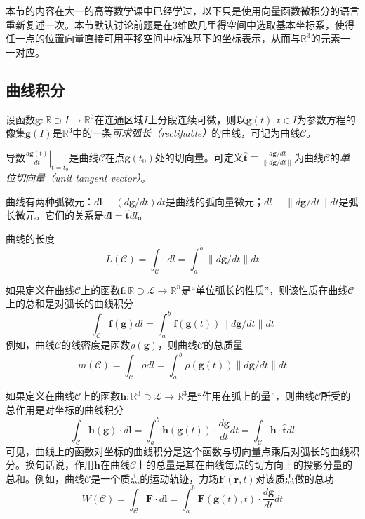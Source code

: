 \documentclass[main.tex]{subfiles}
\begin{document}
本节的内容在大一的高等数学课中已经学过\cite[\S 9]{华工高数2009下}，以下只是使用向量函数微积分的语言重新复述一次。本节默认讨论前题是在3维欧几里得空间中选取基本坐标系，使得任一点的位置向量直接可用平移空间中标准基下的坐标表示，从而与$\mathbb{R}^3$的元素一一对应。

\subsection{曲线积分}
设函数$\mathbf{g}:\mathbb{R}\supset I\rightarrow\mathbb{R}^3$在连通区域$I$上分段连续可微，则以$\mathbf{g}\left(t\right),t\in I$为参数方程的像集$\mathbf{g}\left(I\right)$是$\mathbb{R}^3$中的一条\emph{可求弧长（rectifiable）}的曲线，可记为曲线$\mathcal{C}$。

导数$\left.\frac{d\mathbf{g}\left(t\right)}{dt}\right|_{t=t_0}$是曲线$\mathcal{C}$在点$\mathbf{g}\left(t_0\right)$处的切向量。可定义$\mathbf{\hat{t}}\equiv\frac{d\mathbf{g}/dt}{\left\|d\mathbf{g}/dt\right\|}$为曲线$\mathcal{C}$的\emph{单位切向量（unit tangent vector）}。

曲线有两种弧微元：$d\mathbf{l}\equiv\left(d\mathbf{g}/dt\right)dt$是曲线的弧向量微元；$dl\equiv\left\|d\mathbf{g}/dt\right\|dt$是弧长微元。它们的关系是$d\mathbf{l}=\mathbf{\hat{t}}dl$。

曲线的长度
\[L\left(\mathcal{C}\right)=\int_\mathcal{C}dl=\int_a^b\left\|d\mathbf{g}/dt\right\|dt
\]

如果定义在曲线$\mathcal{C}$上的函数$\mathbf{f}:\mathbb{R}\supset\mathcal{L}\rightarrow\mathbb{R}^n$是“单位弧长的性质”，则该性质在曲线$\mathcal{C}$上的总和是对弧长的曲线积分\cite[\S 9.1,定理9.1.1]{华工高数2009下}
\[
    \int_\mathcal{C}\mathbf{f}\left(\mathbf{g}\right)dl=\int_{a}^{b}\mathbf{f}\left(\mathbf{g}\left(t\right)\right)\left\|d\mathbf{g}/dt\right\|dt
\]
例如，曲线$\mathcal{C}$的线密度是函数$\rho\left(\mathbf{g}\right)$，则曲线$\mathcal{C}$的总质量
\[
    m\left(\mathcal{C}\right)=\int_\mathcal{C}\rho dl=\int_a^b\rho\left(\mathbf{g}\left(t\right)\right)\left\|d\mathbf{g}/dt\right\|dt
\]

如果定义在曲线$\mathcal{C}$上的函数$\mathbf{h}:\mathbb{R}^3\supset\mathcal{L}\rightarrow\mathbb{R}^3$是“作用在弧上的量”，则曲线$\mathcal{C}$所受的总作用是对坐标的曲线积分\cite[p.~140,定理9.2.1]{华工高数2009下}
\[
    \int_\mathcal{C}\mathbf{h}\left(\mathbf{g}\right)\cdot d\mathbf{l}=\int_a^b\mathbf{h}\left(\mathbf{g}\left(t\right)\right)\cdot\frac{d\mathbf{g}}{dt}dt=\int_\mathcal{C}\mathbf{h}\cdot\mathbf{\hat{t}}dl
\]
可见，曲线上的函数对坐标的曲线积分是这个函数与切向量点乘后对弧长的曲线积分。换句话说，作用$\mathbf{h}$在曲线$\mathcal{C}$上的总量是其在曲线每点的切方向上的投影分量的总和。例如，曲线$\mathcal{C}$是一个质点的运动轨迹，力场$\mathbf{F}\left(\mathbf{r},t\right)$对该质点做的总功
\[W\left(\mathcal{C}\right)=\int_\mathcal{C}\mathbf{F}\cdot d\mathbf{l}=\int_a^b\mathbf{F}\left(\mathbf{g}\left(t\right),t\right)\cdot \frac{d\mathbf{g}}{dt}dt
\]
\end{document}
